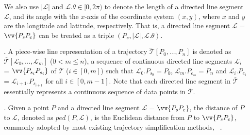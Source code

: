 We also use $|\mathcal{L}|$ and $\mathcal{L}.\theta\in [0, 2\pi)$ to denote the length of a directed line segment $\mathcal{L}$, and its angle with the $x$-axis of the coordinate system $(x, y)$, where $x$ and $y$ are the longitude and latitude, respectively.
That is, a directed line segment $\mathcal{L}$ = $\vv{P_{s}P_{e}}$ can be treated as a triple $(P_s, |\mathcal{L}|, \mathcal{L}.\theta)$.

. A piece-wise line representation of a trajectory $\dddot{\mathcal{T}}[P_0, \ldots, P_n]$ is denoted as $\overline{\mathcal{T}}[\mathcal{L}_0, \ldots , \mathcal{L}_m]$ ($0< m \le n$), a sequence of continuous directed line segments $\mathcal{L}_{i}$ = $\vv{P_{s_i}P_{e_i}}$ of $\dddot{\mathcal{T}}$ ($i\in[0,m]$)  such that $\mathcal{L}_{0}.P_{s_0} = P_0$, $\mathcal{L}_{m}.P_{e_m} = P_n$ and  $\mathcal{L}_{i}.P_{e_i}$ = $\mathcal{L}_{i+1}.P_{s_{i+1}}$ for all $i\in[0, m-1]$. Note that each directed line segment in $\overline{\mathcal{T}}$ essentially represents a continuous sequence of data points in $\dddot{\mathcal{T}}$.



. Given a point $P$ and a directed line segment $\mathcal{L}$ = $\vv{P_{s}P_{e}}$, the distance of $P$ to $\mathcal{L}$, denoted as $ped(P, \mathcal{L})$, is the Euclidean distance from $P$ to $\vv{P_sP_e}$, commonly adopted by most existing trajectory simplification methods, \eg~\cite{Douglas:Peucker, Hershberger:Speeding, Keogh:online, Chen:Fast, Liu:BQS, Williams:Longest, Sklansky:Cone, Dunham:Cone, Zhao:Sleeve, lin:operb}.


